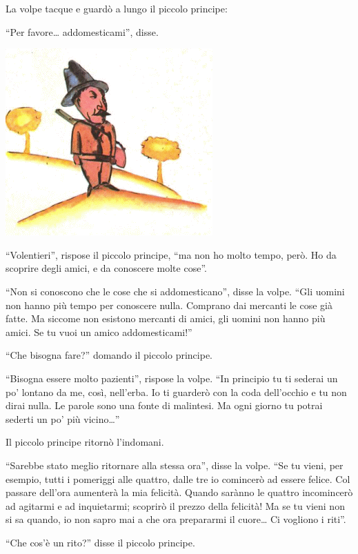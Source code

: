 \documentclass[11pt]{scrbook}
\begin{document}
La volpe tacque e guardò a lungo il piccolo principe:

``Per favore\ldots{} addomesticami'', disse.

\begin{center}
\includegraphics{img/myslivec}
\end{center}

``Volentieri'', rispose il piccolo principe, ``ma non ho molto tempo, però. Ho da scoprire degli amici, e da conoscere molte cose''.

``Non si conoscono che le cose che si addomesticano'', disse la volpe. ``Gli uomini non hanno più tempo per conoscere nulla. Comprano dai mercanti le cose già fatte. Ma siccome non esistono mercanti di amici, gli uomini non hanno più amici. Se tu vuoi un amico addomesticami!''

``Che bisogna fare?'' domando il piccolo principe.

``Bisogna essere molto pazienti'', rispose la volpe. ``In principio tu ti sederai un po' lontano da me, così, nell'erba. Io ti guarderò con la coda dell'occhio e tu non dirai nulla. Le parole sono una fonte di malintesi. Ma ogni giorno tu potrai sederti un po' più vicino\ldots{}''

Il piccolo principe ritornò l'indomani.

``Sarebbe stato meglio ritornare alla stessa ora'', disse la volpe. ``Se tu vieni, per esempio, tutti i pomeriggi alle quattro, dalle tre io comincerò ad essere felice. Col passare dell'ora aumenterà la mia felicità. Quando sarànno le quattro incomincerò ad agitarmi e ad inquietarmi; scoprirò il prezzo della felicità! Ma se tu vieni non si sa quando, io non sapro mai a che ora prepararmi il cuore\ldots{} Ci vogliono i riti''.

``Che cos'è un rito?'' disse il piccolo principe.
\end{document}
